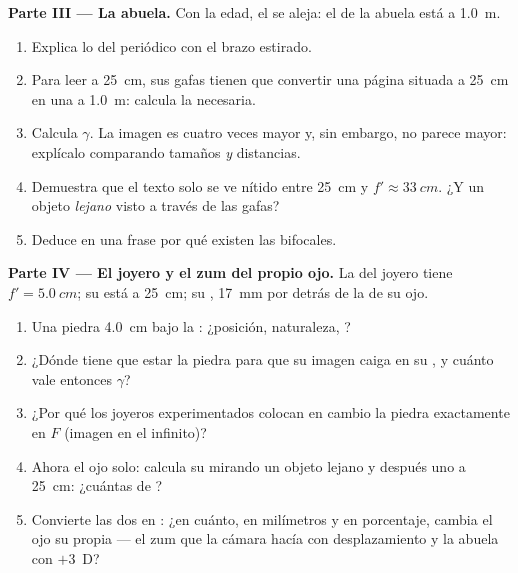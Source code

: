 \begin{problem}
\medskip
\noindent\textbf{Parte III --- La abuela.}
Con la edad, el  se aleja: el de la abuela está a
\qty{1.0}{m}.
\begin{enumerate}[resume]
  \item Explica lo del periódico con el brazo estirado.
  \item Para leer a \qty{25}{cm}, sus gafas tienen que convertir una
        página situada a \qty{25}{cm} en una  a
        \qty{1.0}{m}: calcula la  necesaria.
  \item Calcula $\gamma$. La imagen es cuatro veces mayor y, sin
        embargo, no parece mayor: explícalo comparando tamaños \emph{y}
        distancias.
  \item Demuestra que el texto solo se ve nítido entre \qty{25}{cm} y
        $f' \approx \qty{33}{cm}$. ¿Y un objeto \emph{lejano} visto a
        través de las gafas?
  \item Deduce en una frase por qué existen las  bifocales.
\end{enumerate}

\medskip
\noindent\textbf{Parte IV --- El joyero y el zum del propio ojo.}
La  del joyero tiene $f' = \qty{5.0}{cm}$; su  está a
\qty{25}{cm}; su , \qty{17}{mm} por detrás de la  de su ojo.
\begin{enumerate}[resume]
  \item Una piedra \qty{4.0}{cm} bajo la : ¿posición, naturaleza,
        ?
  \item ¿Dónde tiene que estar la piedra para que su imagen caiga en su
        , y cuánto vale entonces $\gamma$?
  \item ¿Por qué los joyeros experimentados colocan en cambio la piedra
        exactamente en $F$ (imagen en el infinito)?
  \item Ahora el ojo solo: calcula su  mirando un objeto
        lejano y después uno a \qty{25}{cm}: ¿cuántas  de
        ?
  \item Convierte las dos  en : ¿en
        cuánto, en milímetros y en porcentaje, cambia el ojo su propia
         --- el zum que la cámara hacía con
        desplazamiento y la abuela con $+3$~D?
\end{enumerate}
\end{problem}
